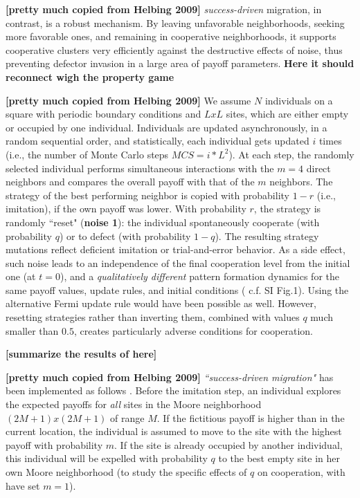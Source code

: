 {\bf [pretty much copied from Helbing 2009]} {\it success-driven} migration, in contrast, is a robust mechanism. By leaving unfavorable neighborhoods, seeking more favorable ones, and remaining in cooperative neighborhoods, it supports cooperative clusters very efficiently against the destructive effects of noise, thus preventing defector invasion in a large area of payoff parameters. {\bf Here it should reconnect wigh the property game}

{\bf [pretty much copied from Helbing 2009]} We assume $N$ individuals on a square with periodic boundary conditions and $LxL$ sites, which are either empty or occupied by one individual. Individuals are updated asynchronously, in a random sequential order, and statistically, each individual gets updated $i$ times (i.e., the number of Monte Carlo steps $MCS=i*L^2$). At each step, the randomly selected individual performs simultaneous interactions with the $m=4$ direct neighbors and compares the overall payoff with that of the $m$ neighbors. The strategy of the best performing neighbor is copied with probability $1-r$ (i.e., imitation), if the own payoff was lower. With probability $r$, the strategy is randomly ``reset" ({\bf noise 1}): the individual spontaneously cooperate (with probability $q$) or to defect (with probability $1-q$). The resulting strategy mutations reflect deficient imitation or trial-and-error behavior. As a side effect, such noise leads to an independence of the final cooperation level from the initial one (at $t=0$), and a {\it qualitatively different} pattern formation dynamics for the same payoff values, update rules, and initial conditions ( c.f. SI Fig.1). Using the alternative Fermi update rule \cite{} would have been possible as well. However, resetting strategies rather than inverting them, combined with values $q$ much smaller than $0.5$, creates particularly adverse conditions for cooperation.

{\bf [summarize the results of \cite{helbing2009} here]}

{\bf [pretty much copied from Helbing 2009]} {\it ``success-driven migration"} has been implemented as follows \cite{}. Before the imitation step, an individual explores the expected payoffs for {\it all} sites in the Moore neighborhood $(2M + 1) x (2M + 1)$ of range $M$. If the fictitious payoff is higher than in the current location, the individual is assumed to move to the site with the highest payoff with probability $m$. If the site is already occupied by another individual, this individual will be expelled with probability $q$ to the best empty site in her own Moore neighborhood (to study the specific effects of $q$ on cooperation, with have set $m=1$).

